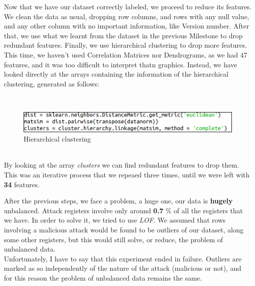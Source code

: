 \documentclass[idxtotoc,hyperref,openany]{labbook} %
\begin{document}


Now that we have our dataset correctly labeled, we proceed to reduce its features. We clean the data as usual, dropping row columns, and rows with any null value, and any other column with no important information, like Version number. After that, we use what we learnt from the dataset in the previous Milestone to drop redundant features. Finally, we use hierarchical clustering to drop more features. This time, we haven't used Correlation Matrices nor Dendrograms, as we had 47 features, and it was too difficult to interpret thatn graphics. Instead, we have looked directly at the arrays containing the information of the hierarchical clustering, generated as follows:

\textbf{  }\\

\begin{figure}[h]
\includegraphics[width=0.9\linewidth]{Milestone2/hierarchical.png}
\setlength\belowcaptionskip{-10pt}
\caption{Hierarchical clustering}
\label{Acceleration Factorplot 2}
\end{figure}

\textbf{  }\\

By looking at the array \textit{clusters} we can find redundant features to drop them. This was an iterative process that we repeaed three times, until we were left with \textbf{34} features.

\clearpage
{}

After the previous steps, we face a problem, a huge one, our data is \textbf{hugely} unbalanced. Attack registers involve only around \textbf{0.7} \% of all the registers that we have. In order to solve it, we tried to use \textit{LOF}. We assumed that rows involving a malicious attack would be found to be outliers of our dataset, along some other registers, but this would still solve, or reduce, the problem of unbalanced data.\\



Unfortunately, I have to say that this experiment ended in failure. Outliers are marked as so independently of the nature of the attack (malicious or not), and for this reason the problem of unbalanced data remains the same.\\
\end{document}
